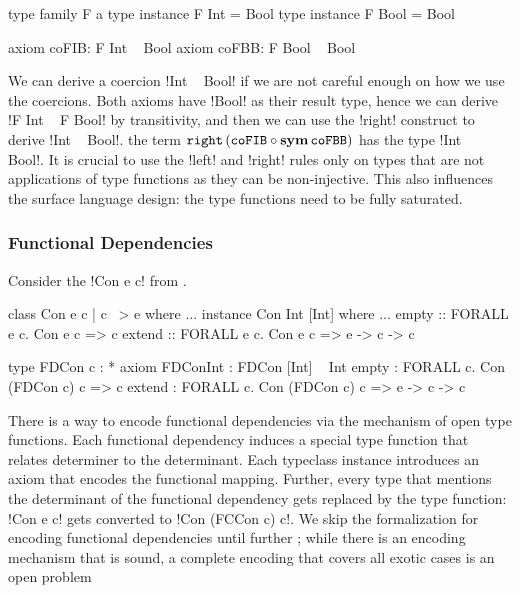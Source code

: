 \documentclass[manuscript,screen,nonacm]{acmart}
\begin{document}
\begin{minipage}[ht]{0.5\linewidth}
\begin{code}
type family F a
type instance F Int = Bool
type instance F Bool = Bool
\end{code}
\end{minipage}%
\begin{minipage}[ht]{0.5\linewidth}
\begin{code}
axiom coFIB: F Int ~ Bool
axiom coFBB: F Bool ~ Bool
\end{code}
\end{minipage}

We can derive a coercion !Int ~ Bool! if we are not careful enough on how we use the coercions. Both axioms have !Bool! as their result type, hence we can derive !F Int ~ F Bool! by transitivity, and then we can use the !right! construct to derive !Int ~ Bool!. the term $\texttt{right}\,({\texttt{coFIB}} \circ {\textbf{sym}\,{\texttt{coFBB}}})$ has the type !Int ~ Bool!. It is crucial to use the !left! and !right! rules only on types that are not applications of type functions as they can be non-injective. This also influences the surface language design: the type functions need to be fully saturated.

\subsubsection{Functional Dependencies}\label{sec:fc-encodes-fundeps}
Consider the !Con e c! from .

\begin{minipage}[ht]{0.5\linewidth}
\begin{code}
class Con e c | c ~> e where ...
instance Con Int [Int] where ...
empty :: FORALL e c. Con e c => c
extend :: FORALL e c. Con e c => e -> c -> c
\end{code}
\end{minipage}%
\begin{minipage}[ht]{0.5\linewidth}
\begin{code}
type FDCon c : *
axiom FDConInt : FDCon [Int] ~ Int
empty  : FORALL c. Con (FDCon c) c => c
extend : FORALL c. Con (FDCon c) c => e -> c -> c
\end{code}
\end{minipage}

There is a way to encode functional dependencies via the mechanism of open type functions. Each functional dependency induces a special type function that relates determiner to the determinant. Each typeclass instance introduces an axiom that encodes the functional mapping. Further, every type that mentions the determinant of the functional dependency gets replaced by the type function: !Con e c! gets converted to !Con (FCCon c) c!.
We skip the formalization for encoding functional dependencies until further ; while there is an encoding mechanism that is sound, a complete encoding that covers all exotic cases is an open problem
\end{document}
